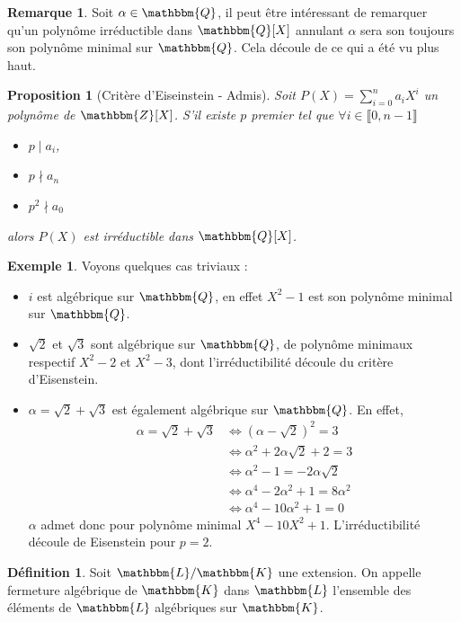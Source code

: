 \documentclass[12pt]{article}
\newcommand{\jL}{\mathbbm{L}}
\newcommand{\Z}{\mathbbm{Z}}
\newcommand{\Q}{\mathbbm{Q}}
\newcommand{\K}{\mathbbm{K}}
\newtheorem{prop}{Proposition}
\theoremstyle{definition}\newtheorem{defn}{Définition}
\theoremstyle{definition}\newtheorem{exm}{Exemple}
\theoremstyle{definition}\newtheorem{rem}{Remarque}
\theoremstyle{definition}\newtheorem{algo}{Algorithme}
\theoremstyle{remark}\newtheorem{exo}{Exercice}
\theoremstyle{remark}\newtheorem{nota}{Notation}
\begin{document}
\begin{rem}
Soit $\alpha \in \Q$, il peut être intéressant de remarquer qu'un polynôme irréductible dans $\Q[X]$ annulant $\alpha$ sera son toujours son polynôme minimal sur $\Q$. Cela découle de ce qui a été vu plus haut.
\end{rem}

\begin{prop}[Critère d'Eiseinstein - Admis]
Soit $P(X) = \displaystyle \sum_{i=0}^{n}a_iX^i$ un polynôme de $\Z[X]$. S'il existe $p$ premier tel que $\forall i \in \llbracket 0, n-1 \rrbracket$
\begin{itemize}
	\item $p \mid a_i$, 
	\item $p \nmid a_n$
	\item $p^2 \nmid a_0$
\end{itemize}
alors $P(X)$ est irréductible dans $\Q[X]$.
\end{prop}

\begin{exm}
Voyons quelques cas triviaux :
	\begin{itemize}
		\item $i$ est algébrique sur $\Q$, en effet $X^2-1$ est son polynôme minimal sur $\Q$.
		\item $\sqrt2$ et $\sqrt3$ sont algébrique sur $\Q$, de polynôme minimaux respectif $X^2 -2$ et $X^2-3$, dont l'irréductibilité découle du critère d'Eisenstein.
		\item $\alpha = \sqrt2 + \sqrt3$ est également algébrique sur $\Q$. En effet,
\begin{align*}
 \alpha = \sqrt2 + \sqrt3 &\Leftrightarrow (\alpha-\sqrt2)^2= 3\\ &\Leftrightarrow \alpha^2 + 2\alpha\sqrt2 + 2 = 3\\ &\Leftrightarrow \alpha^2 - 1 =  -2\alpha\sqrt2\\ &\Leftrightarrow \alpha^4 - 2\alpha^2 +1 =  8\alpha^2\\ &\Leftrightarrow \alpha^4 - 10\alpha^2 +1 = 0
\end{align*}		
$\alpha$ admet donc pour polynôme minimal $X^4 -10X^2 +1$. L'irréductibilité découle de Eisenstein pour $p=2$.	
	\end{itemize}
\end{exm}

\begin{defn}
Soit $\jL / \K$ une extension. On appelle fermeture algébrique de $\K$ dans $\jL$ l'ensemble des éléments de $\jL$ algébriques sur $\K$.
\end{defn}
\end{document}
